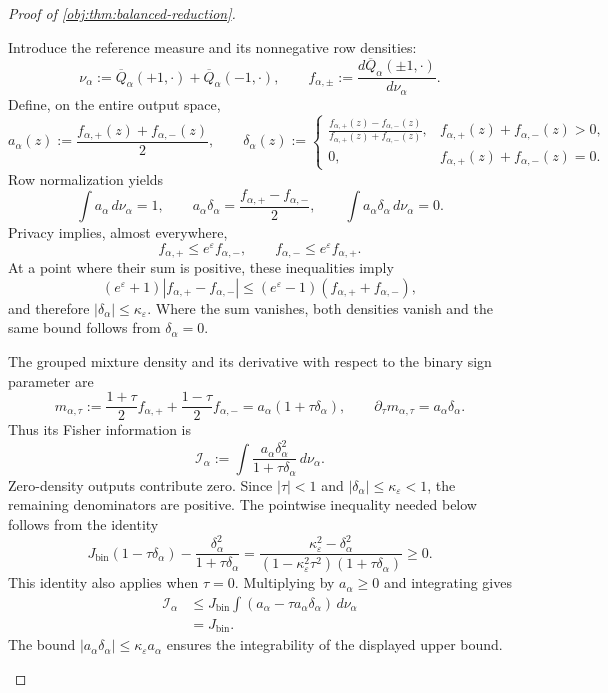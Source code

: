 \documentclass[11pt]{article}
\begin{document}
\begin{proof}[Proof of \cref{obj:thm:balanced-reduction}]
\begin{enumerate}
Introduce the reference measure and its nonnegative row densities:
\[
\nu_\alpha
:=\overline Q_\alpha(+1,\cdot)
+\overline Q_\alpha(-1,\cdot),
\qquad
f_{\alpha,\pm}
:=\frac{d\overline Q_\alpha(\pm1,\cdot)}{d\nu_\alpha}.
\]
Define, on the entire output space,
\[
a_\alpha(z)
:=\frac{f_{\alpha,+}(z)+f_{\alpha,-}(z)}2,
\qquad
\delta_\alpha(z)
:=
\begin{cases}
\displaystyle
\frac{f_{\alpha,+}(z)-f_{\alpha,-}(z)}
{f_{\alpha,+}(z)+f_{\alpha,-}(z)},
& f_{\alpha,+}(z)+f_{\alpha,-}(z)>0,\\[6pt]
0,& f_{\alpha,+}(z)+f_{\alpha,-}(z)=0.
\end{cases}
\]
Row normalization yields
\[
\int a_\alpha\,d\nu_\alpha=1,
\qquad
a_\alpha\delta_\alpha
=\frac{f_{\alpha,+}-f_{\alpha,-}}2,
\qquad
\int a_\alpha\delta_\alpha\,d\nu_\alpha=0.
\]
Privacy implies, almost everywhere,
\[
f_{\alpha,+}\le e^\varepsilon f_{\alpha,-},
\qquad
f_{\alpha,-}\le e^\varepsilon f_{\alpha,+}.
\]
At a point where their sum is positive, these inequalities imply
\[
(e^\varepsilon+1)|f_{\alpha,+}-f_{\alpha,-}|
\le
(e^\varepsilon-1)(f_{\alpha,+}+f_{\alpha,-}),
\]
and therefore \(|\delta_\alpha|\le\kappa_\varepsilon\).
Where the sum vanishes, both densities vanish and the same bound follows
from \(\delta_\alpha=0\).

The grouped mixture density and its derivative with respect to the
binary sign parameter are
\[
m_{\alpha,\tau}
:=\frac{1+\tau}{2}f_{\alpha,+}
+\frac{1-\tau}{2}f_{\alpha,-}
=a_\alpha(1+\tau\delta_\alpha),
\qquad
\partial_\tau m_{\alpha,\tau}=a_\alpha\delta_\alpha.
\]
Thus its Fisher information is
\[
\mathcal I_\alpha
:=\int
\frac{a_\alpha\delta_\alpha^2}
{1+\tau\delta_\alpha}\,d\nu_\alpha.
\]
Zero-density outputs contribute zero. Since
\(|\tau|<1\) and \(|\delta_\alpha|\le\kappa_\varepsilon<1\), the remaining
denominators are positive. The pointwise inequality needed below follows
from the identity
\[
J_{\mathrm{bin}}(1-\tau\delta_\alpha)
-\frac{\delta_\alpha^2}{1+\tau\delta_\alpha}
=
\frac{\kappa_\varepsilon^2-\delta_\alpha^2}
{(1-\kappa_\varepsilon^2\tau^2)(1+\tau\delta_\alpha)}
\ge0.
\]
This identity also applies when \(\tau=0\).
Multiplying by \(a_\alpha\ge0\) and integrating gives
\[
\begin{aligned}
\mathcal I_\alpha
&\le
J_{\mathrm{bin}}
\int(a_\alpha-\tau a_\alpha\delta_\alpha)\,d\nu_\alpha\\
&=J_{\mathrm{bin}}.
\end{aligned}
\]
The bound \(|a_\alpha\delta_\alpha|\le\kappa_\varepsilon a_\alpha\)
ensures the integrability of the displayed upper bound.


\end{enumerate}
\end{proof}
\end{document}
